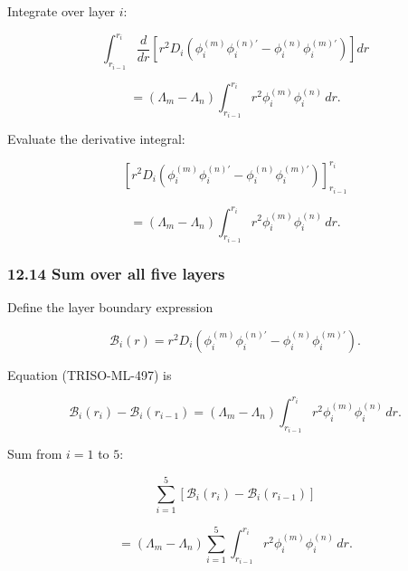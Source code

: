 \documentclass[11pt,a4paper]{article}
\begin{document}
Integrate over layer $i$:

\begin{equation}
\int_{r_{i-1}}^{r_i}
\frac{d}{dr}
\left[
r^2D_i
\left(
\phi_i^{(m)}\phi_i^{(n)\prime}
-
\phi_i^{(n)}\phi_i^{(m)\prime}
\right)
\right]dr
\end{equation}

\begin{equation}
=
(\Lambda_m-\Lambda_n)
\int_{r_{i-1}}^{r_i}
r^2\phi_i^{(m)}\phi_i^{(n)}\,dr.
\tag{TRISO-ML-496}
\label{eq:triso-ml-496}
\end{equation}

Evaluate the derivative integral:

\begin{equation}
\left[
r^2D_i
\left(
\phi_i^{(m)}\phi_i^{(n)\prime}
-
\phi_i^{(n)}\phi_i^{(m)\prime}
\right)
\right]_{r_{i-1}}^{r_i}
\end{equation}

\begin{equation}
=
(\Lambda_m-\Lambda_n)
\int_{r_{i-1}}^{r_i}
r^2\phi_i^{(m)}\phi_i^{(n)}\,dr.
\tag{TRISO-ML-497}
\label{eq:triso-ml-497}
\end{equation}

\subsubsection*{12.14 Sum over all five layers}

Define the layer boundary expression

\begin{equation}
\mathcal B_i(r)
=
r^2D_i
\left(
\phi_i^{(m)}\phi_i^{(n)\prime}
-
\phi_i^{(n)}\phi_i^{(m)\prime}
\right).
\tag{TRISO-ML-498}
\label{eq:triso-ml-498}
\end{equation}

Equation (TRISO-ML-497) is

\begin{equation}
\mathcal B_i(r_i)
-
\mathcal B_i(r_{i-1})
=
(\Lambda_m-\Lambda_n)
\int_{r_{i-1}}^{r_i}
r^2\phi_i^{(m)}\phi_i^{(n)}\,dr.
\tag{TRISO-ML-499}
\label{eq:triso-ml-499}
\end{equation}

Sum from $i=1$ to $5$:

\begin{equation}
\sum_{i=1}^{5}
\left[
\mathcal B_i(r_i)
-
\mathcal B_i(r_{i-1})
\right]
\end{equation}

\begin{equation}
=
(\Lambda_m-\Lambda_n)
\sum_{i=1}^{5}
\int_{r_{i-1}}^{r_i}
r^2\phi_i^{(m)}\phi_i^{(n)}\,dr.
\tag{TRISO-ML-500}
\label{eq:triso-ml-500}
\end{equation}
\end{document}
